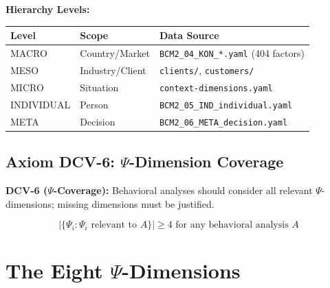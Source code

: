 \textbf{Hierarchy Levels:}

\begin{center}
\begin{tabular}{lll}
\toprule
\textbf{Level} & \textbf{Scope} & \textbf{Data Source} \\
\midrule
MACRO & Country/Market & \texttt{BCM2\_04\_KON\_*.yaml} (404 factors) \\
MESO & Industry/Client & \texttt{clients/}, \texttt{customers/} \\
MICRO & Situation & \texttt{context-dimensions.yaml} \\
INDIVIDUAL & Person & \texttt{BCM2\_05\_IND\_individual.yaml} \\
META & Decision & \texttt{BCM2\_06\_META\_decision.yaml} \\
\bottomrule
\end{tabular}
\end{center}

\subsection{Axiom DCV-6: $\Psi$-Dimension Coverage}

\begin{tcolorbox}[colback=blue!5!white, colframe=blue!75!black]
\textbf{DCV-6 ($\Psi$-Coverage):} Behavioral analyses should consider all relevant $\Psi$-dimensions; missing dimensions must be justified.

\begin{equation}
|\{\Psi_i : \Psi_i \text{ relevant to } A\}| \geq 4 \text{ for any behavioral analysis } A
\end{equation}
\end{tcolorbox}

\section{The Eight $\Psi$-Dimensions}
\label{sec:vc-psi}

